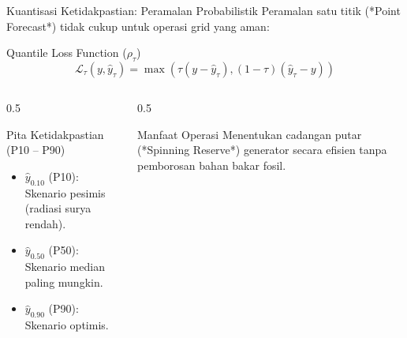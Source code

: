 \documentclass[aspectratio=169, 10pt]{beamer}
\begin{document}
\begin{frame}{Kuantisasi Ketidakpastian: Peramalan Probabilistik}
    Peramalan satu titik (*Point Forecast*) tidak cukup untuk operasi grid yang aman:
    \begin{block}{Quantile Loss Function ($\rho_\tau$)}
        \begin{equation}
            \mathcal{L}_\tau(y, \hat{y}_\tau) = \max\left( \tau(y - \hat{y}_\tau), (1 - \tau)(\hat{y}_\tau - y) \right)
        \end{equation}
    \end{block}
    \begin{columns}[T]
        \begin{column}{0.5\textwidth}
            \begin{block}{Pita Ketidakpastian (P10 -- P90)}
                \begin{itemize}
                    \item $\hat{y}_{0.10}$ (P10): Skenario pesimis (radiasi surya rendah).
                    \item $\hat{y}_{0.50}$ (P50): Skenario median paling mungkin.
                    \item $\hat{y}_{0.90}$ (P90): Skenario optimis.
                \end{itemize}
            \end{block}
        \end{column}
        \begin{column}{0.5\textwidth}
            \begin{alertblock}{Manfaat Operasi}
                Menentukan cadangan putar (*Spinning Reserve*) generator secara efisien tanpa pemborosan bahan bakar fosil.
            \end{alertblock}
        \end{column}
    \end{columns}
\end{frame}
\end{document}
